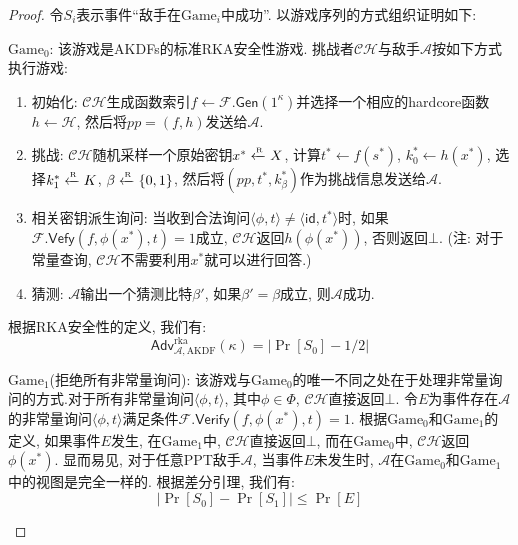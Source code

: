 \begin{proof}
令$S_i$表示事件``敌手在$\text{Game}_i$中成功''. 以游戏序列的方式组织证明如下:
\begin{trivlist}
\item $\text{Game}_0$: 该游戏是AKDFs的标准RKA安全性游戏. 挑战者$\mathcal{CH}$与敌手$\mathcal{A}$按如下方式执行游戏:
\begin{enumerate}\itemsep 1pt \parskip 0pt \parsep 0pt
\item 初始化: $\mathcal{CH}$生成函数索引$f \leftarrow \mathcal{F}.\mathsf{Gen}(1^\kappa)$并选择一个相应的hardcore函数$h \leftarrow \mathcal{H}$, 然后将$pp = (f, h)$发送给$\mathcal{A}$. 

\item 挑战: $\mathcal{CH}$随机采样一个原始密钥$x^* \xleftarrow{\textup{\tiny R}} X$, 计算$t^* \leftarrow f(s^*)$, $k_0^* \leftarrow h(x^*)$, 选择$k_1^* \xleftarrow{\textup{\tiny R}} K$, $\beta \xleftarrow{\textup{\tiny R}} \{0,1\}$, 
	然后将$(pp, t^*, k_\beta^*)$作为挑战信息发送给$\mathcal{A}$. 

\item 相关密钥派生询问: 当收到合法询问$\langle \phi, t \rangle \neq \langle \mathsf{id}, t^* \rangle$时, 如果$\mathcal{F}.\mathsf{Vefy}(f, \phi(x^*), t) = 1$成立, $\mathcal{CH}$返回$h(\phi(x^*))$, 否则返回$\bot$. (注: 对于常量查询, $\mathcal{CH}$不需要利用$x^*$就可以进行回答.)

\item 猜测: $\mathcal{A}$输出一个猜测比特$\beta'$, 如果$\beta' = \beta$成立, 则$\mathcal{A}$成功.     
\end{enumerate}

\item 根据RKA安全性的定义, 我们有: 
\begin{equation*}
\mathsf{Adv}_{\mathcal{A}, \text{AKDF}}^{\text{rka}}(\kappa) = |\Pr[S_0] - 1/2|
\end{equation*}

\item $\text{Game}_1$(拒绝所有非常量询问): 该游戏与$\text{Game}_0$的唯一不同之处在于处理非常量询问的方式.对于所有非常量询问$\langle \phi, t \rangle$, 其中$\phi \in \Phi$,  $\mathcal{CH}$直接返回$\bot$. 令$E$为事件存在$\mathcal{A}$的非常量询问$\langle \phi, t \rangle$满足条件$\mathcal{F}.\mathsf{Verify}(f, \phi(x^*), t) = 1$. 根据$\text{Game}_0$和$\text{Game}_1$的定义, 如果事件$E$发生, 在$\text{Game}_1$中, $\mathcal{CH}$直接返回$\bot$, 而在$\text{Game}_0$中, $\mathcal{CH}$返回$\phi(x^*)$. 显而易见, 对于任意PPT敌手$\mathcal{A}$, 当事件$E$未发生时, $\mathcal{A}$在$\text{Game}_0$和$\text{Game}_1$中的视图是完全一样的. 根据差分引理, 我们有: 
    \begin{equation*}
        |\Pr[S_0] - \Pr[S_1]| \leq \Pr[E]
    \end{equation*} 
	

\end{trivlist}
\end{proof}
